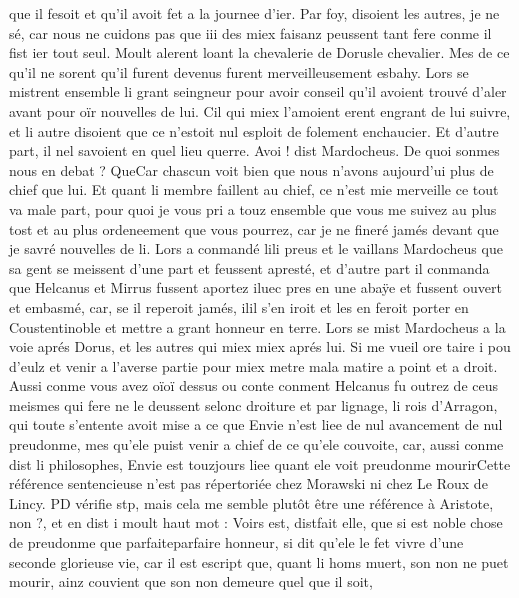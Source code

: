 \documentclass{article}
\begin{document}
\begin{pages}
      que il fesoit et qu’il avoit fet a la journee d’ier.
   Par foy, disoient les autres, je ne sé, car nous ne cuidons pas que iii des miex faisanz 
   peussent tant fere conme il fist ier tout seul.
   Moult alerent loant la chevalerie de 
      Dorusle chevalier. Mes de ce qu’il ne sorent qu’il furent devenus furent merveilleusement esbahy. 
   Lors se mistrent ensemble li grant seingneur pour avoir conseil qu’il avoient trouvé d’aler avant pour oïr nouvelles de lui. 
   Cil qui miex l’amoient erent engrant de lui suivre, et li autre disoient que ce n’estoit nul esploit 
      de folement enchaucier. Et d’autre part, il nel savoient
   en quel lieu querre.
   Avoi ! dist Mardocheus. De quoi sonmes nous en debat ? 
      QueCar chascun voit bien que nous n’avons aujourd’ui plus de chief que 
      lui. Et quant li membre faillent au chief, ce n’est mie merveille ce tout va male part, pour quoi je vous pri a touz ensemble 
      que vous me suivez au plus tost et au plus ordeneement que vous pourrez, 
      car je ne fineré jamés devant que je savré nouvelles de li.
   Lors a conmandé lili preus et le vaillans 
   Mardocheus que sa gent se meissent d’une part et feussent 
      apresté, et d’autre part il conmanda que Helcanus et 
         Mirrus fussent aportez iluec pres en une abaÿe et fussent ouvert et embasmé, car, 
         se il reperoit jamés, ilil s'en iroit et les en feroit 
         porter en Coustentinoble et 
         mettre a grant honneur en terre. 
   Lors se mist Mardocheus a la voie aprés Dorus, 
   et les autres qui miex miex aprés lui. Si me vueil ore taire i pou d’eulz et venir a l’averse partie 
   pour miex metre mala matire a point et 
      a droit. \pend
\pstart Aussi conme vous avez 
   oïoï dessus ou conte conment 
   Helcanus fu outrez de ceus meismes qui fere ne le deussent selonc droiture et par lignage, 
   li rois d’Arragon, qui toute s’entente avoit 
   mise a ce que Envie n’est liee de nul avancement de nul preudonme, mes qu’ele 
   puist venir a chief de ce qu’ele couvoite, car, aussi conme dist li philosophes, Envie est touzjours liee 
      quant ele voit preudonme mourirCette référence sentencieuse 
         n'est pas répertoriée chez Morawski ni chez Le Roux de Lincy. PD vérifie stp, mais cela me semble plutôt être une référence
      à Aristote, non ?, et en dist i moult haut mot : 
   Voirs est, distfait elle, que si est noble 
      chose de preudonme que parfaiteparfaire honneur, 
   si dit qu’ele le fet vivre d’une seconde glorieuse vie, car il est escript que, quant li homs muert, 
      son non ne puet mourir, ainz couvient que son non demeure quel que il soit, 

\end{pages}
\end{document}
